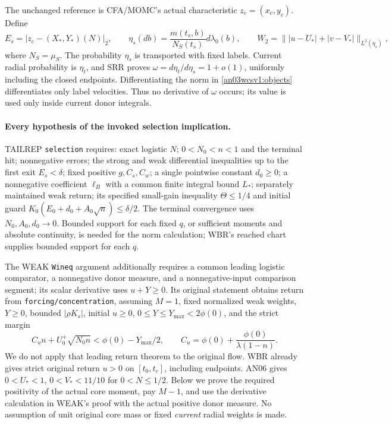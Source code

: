 \documentclass[11pt]{article}
\numberwithin{equation}{section}
\theoremstyle{remark}\newtheorem{remark}[theorem]{Remark}
\newcommand{\ph}{\phi(0)}
\begin{document}
The unchanged reference is CFA/MOMC's actual characteristic
$z_c=(x_c,y_c)$. Define
\begin{equation}
 E_s=|z_c-(X_*,Y_*)(N)|_2,\qquad
 \eta_s(db)=\frac{m(t_s,b)}{N_S(t_s)}d\lambda_0(b),\qquad
 W_2=\big\||u-U_*|+|v-V_*|\big\|_{L^2(\eta_s)},
 \label{an03wcsv1:objects}
\end{equation}
where $N_S=\mu_S$. The probability $\eta_s$ is transported with
fixed labels. Current radial probability is $\eta_t$, and SRR proves
$\omega=d\eta_t/d\eta_s=1+o(1)$, uniformly including the closed
endpoints. Differentiating the norm in \eqref{an03wcsv1:objects}
differentiates only label velocities. Thus no derivative of $\omega$
occurs; its value is used only inside current donor integrals.

\paragraph{Every hypothesis of the invoked selection implication.}
TAILREP \texttt{selection} requires: exact logistic $N$;
$0<N_0<n<1$ and the terminal hit; nonnegative errors; the strong and
weak differential inequalities up to the first exit $E_s<\delta$;
fixed positive $g,C_s,C_w$; a single pointwise constant $d_0\ge0$;
a nonnegative coefficient $\ell_B$ with a common finite integral
bound $L_*$; separately maintained weak return; its specified
small-gain inequality $\Theta\le1/4$ and initial guard
$K_0(E_0+d_0+A_0\sqrt n)\le\delta/2$. The terminal convergence
uses $N_0,A_0,d_0\to0$. Bounded support for each fixed $q$, or
sufficient moments and absolute continuity, is needed for the norm
calculation; WBR's reached chart supplies bounded support for each $q$.

The WEAK \texttt{Wineq} argument additionally requires a common
leading logistic comparator, a nonnegative donor measure, and a
nonnegative-input comparison segment; its scalar derivative uses
$u+Y\ge0$. Its original statement obtains return from
\texttt{forcing/concentration}, assuming $M=1$, fixed normalized
weak weights, $Y\ge0$, bounded $|\rho K_s|$, initial $u\ge0$,
$0\le Y\le Y_{\max}<2\ph$, and the strict margin
\[
 C_u n+U_0^+\sqrt{N_0n}<\ph-Y_{\max}/2,\qquad
 C_u=\ph+\frac{\ph}{\lambda(1-n)}.
\]
We do not apply that leading return theorem to the original flow.
WBR already gives strict original return $u>0$ on $[t_0,t_e]$,
including endpoints. AN06 gives $0<U_*<1$, $0<V_*<11/10$
for $0<N\le1/2$. Below we prove the required positivity of the
actual core moment, pay $M-1$, and use the derivative calculation
in WEAK's proof with the actual positive donor measure. No assumption
of unit original core mass or fixed \emph{current} radial weights
is made.
\end{document}
